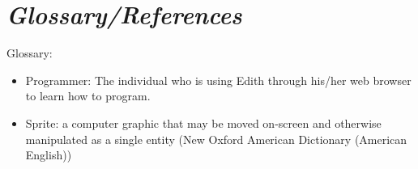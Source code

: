 \documentclass[12pt]{article}
\begin{document}
\section{\emph{Glossary/References}}
Glossary:
\begin{itemize}
	\item Programmer: The individual who is using Edith through his/her web browser to learn how to program.
	\item Sprite: a computer graphic that may be moved on-screen and otherwise manipulated as a single entity (New Oxford American Dictionary (American English))
\end{itemize}
	

	
\end{document}
